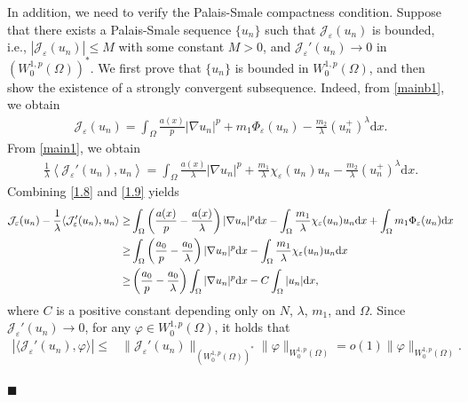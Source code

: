 \documentclass[onecolumn]{autart}
\newenvironment{proof}{{\it Proof: \enspace}}{\hfill $\blacksquare$\par}
\begin{document}
\begin{proof}
	
	In addition, we need to verify the Palais-Smale compactness condition. Suppose that there exists a Palais-Smale  sequence $\{u_n\}$ {such that $\mathcal{J}_\varepsilon(u_n)$} is bounded, i.e., $|\mathcal{J}_\varepsilon(u_n)| \leq M$ with some constant $M>0$, and $\mathcal{J}_\varepsilon'(u_n) \to 0$ in $\left( W^{1,p}_0(\Omega)\right)^*$. We first prove that $\{u_n\}$ is bounded in $W^{1,p}_0(\Omega)$,  and then  show the existence of a strongly convergent subsequence. Indeed, from \eqref{mainb1}, we obtain
	\begin{align}\label{1.8}
		\mathcal{J}_{\varepsilon}(u_n) = \int_{\Omega} \frac{a(x)}{p}|\nabla u_n|^p + m_1 \Phi_{\varepsilon}(u_n) -\frac{m_2}{\lambda}(u_n^+)^{\lambda}  \mathrm{d}x.
	\end{align}
	From \eqref{main1}, we obtain
	\begin{align}\label{1.9}
		\frac{1}{\lambda} \left\langle \mathcal{J}_\varepsilon'(u_n),u_n \right\rangle =  \int_{\Omega} \frac{a(x)}{\lambda}|\nabla u_n|^p +\frac{m_1}{\lambda}\chi_\varepsilon(u_n)u_n-\frac{m_2}{\lambda}(u_n^+)^{\lambda}  \mathrm{d}x.
	\end{align}
	Combining \eqref{1.8} and \eqref{1.9} yields
	\begin{align}
		\mathcal{J}_\varepsilon(u_n) - \frac{1}{\lambda} \langle \mathcal{J}_\varepsilon'(u_n), u_n \rangle
		\geq
		&\int_\Omega \left( \frac{a(x)}{p} - \frac{a(x)}{\lambda} \right)|\nabla u_n|^p \mathrm{d}x - \int_\Omega  \frac{m_1}{\lambda} \chi_\varepsilon(u_n)u_n  \mathrm{d}x
		+ \int_\Omega m_1 \Phi_\varepsilon(u_n)  \mathrm{d}x
		\notag\\\geq
		& \int_\Omega \left( \frac{a_0}{p} - \frac{a_0}{\lambda} \right)|\nabla u_n|^p \mathrm{d}x - \int_\Omega \frac{m_1}{\lambda} \chi_\varepsilon(u_n)u_n  \mathrm{d}x
		\notag \\\geq
		& \left( \frac{a_0}{p} - \frac{a_0}{\lambda} \right)\int_\Omega |\nabla u_n|^p \mathrm{d}x -C\int_\Omega |u_n| \mathrm{d}x , \label{1.10}
	\end{align} 	
	where    $C$ is a positive  constant depending only on $N$, $\lambda$, $m_1$, and $\Omega$.
	Since $\mathcal{J}_\varepsilon'(u_n) \to 0 $, for any $\varphi \in W^{1,p}_{0}(\Omega) $, it holds that
	\begin{align}
		|\langle \mathcal{J}_\varepsilon'(u_n), \varphi \rangle|\leq & \|\mathcal{J}_\varepsilon'(u_n)\|_{\left( W^{1,p}_0(\Omega)\right)^*} \|\varphi\|_{W^{1,p}_{0}(\Omega)}
		=
		o(1)\|\varphi\|_{W^{1,p}_{0}(\Omega)}. \label{1.11}
	\end{align}

\end{proof}
\end{document}
